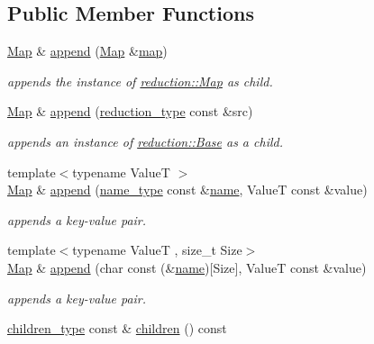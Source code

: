 \subsection*{Public Member Functions}
\begin{DoxyCompactItemize}
\item 
\hyperlink{classhryky_1_1reduction_1_1_map}{Map} \& \hyperlink{classhryky_1_1reduction_1_1_map_a46fcabdd08327b7bdc4c72edb3623e7a}{append} (\hyperlink{classhryky_1_1reduction_1_1_map}{Map} \&\hyperlink{classhryky_1_1reduction_1_1_map_afa54cde058f8b7cc18099b6bcdbe6e72}{map})
\begin{DoxyCompactList}\small\item\em appends the instance of \hyperlink{classhryky_1_1reduction_1_1_map}{reduction\-::\-Map} as child. \end{DoxyCompactList}\item 
\hyperlink{classhryky_1_1reduction_1_1_map}{Map} \& \hyperlink{classhryky_1_1reduction_1_1_map_a50f6b1d260ebe03fe069587ff401afaa}{append} (\hyperlink{namespacehryky_a343a9a4c36a586be5c2693156200eadc}{reduction\-\_\-type} const \&src)
\begin{DoxyCompactList}\small\item\em appends an instance of \hyperlink{classhryky_1_1reduction_1_1_base}{reduction\-::\-Base} as a child. \end{DoxyCompactList}\item 
{\footnotesize template$<$typename Value\-T $>$ }\\\hyperlink{classhryky_1_1reduction_1_1_map}{Map} \& \hyperlink{classhryky_1_1reduction_1_1_map_ac01c4589223683757574ad10c5fa90e1}{append} (\hyperlink{namespacehryky_1_1reduction_ac686c30a4c8d196bbd0f05629a6b921f}{name\-\_\-type} const \&\hyperlink{classhryky_1_1reduction_1_1_base_a842569265d741905eb8a353d3935f1d1}{name}, Value\-T const \&value)
\begin{DoxyCompactList}\small\item\em appends a key-\/value pair. \end{DoxyCompactList}\item 
{\footnotesize template$<$typename Value\-T , size\-\_\-t Size$>$ }\\\hyperlink{classhryky_1_1reduction_1_1_map}{Map} \& \hyperlink{classhryky_1_1reduction_1_1_map_a60cd3dcac94e75366de4df28d580aad4}{append} (char const (\&\hyperlink{classhryky_1_1reduction_1_1_base_a842569265d741905eb8a353d3935f1d1}{name})\mbox{[}Size\mbox{]}, Value\-T const \&value)
\begin{DoxyCompactList}\small\item\em appends a key-\/value pair. \end{DoxyCompactList}\item 
\hypertarget{classhryky_1_1reduction_1_1_map_a3cc9bef29a72ed96079152a93b6dfe13}{\hyperlink{classhryky_1_1reduction_1_1_map_af8ee925fbe74bda242e9dfb7e9f388d1}{children\-\_\-type} const \& \hyperlink{classhryky_1_1reduction_1_1_map_a3cc9bef29a72ed96079152a93b6dfe13}{children} () const }\label{classhryky_1_1reduction_1_1_map_a3cc9bef29a72ed96079152a93b6dfe13}


\end{DoxyCompactItemize}

